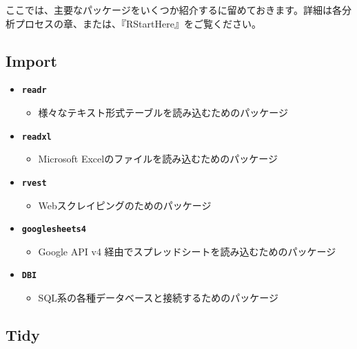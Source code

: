 \documentclass[
  12pt,
]{book}
\providecommand{\tightlist}{%
  \setlength{\itemsep}{0pt}\setlength{\parskip}{0pt}}
\begin{document}
ここでは、主要なパッケージをいくつか紹介するに留めておきます。詳細は各分析プロセスの章、または、『RStartHere』\citep{RStartHere}をご覧ください。

\hypertarget{import-1}{%
\subsection*{Import}\label{import-1}}

\begin{itemize}
\tightlist
\item
  \textbf{\texttt{readr}}

  \begin{itemize}
  \tightlist
  \item
    様々なテキスト形式テーブルを読み込むためのパッケージ\citep{R-readr}
  \end{itemize}
\item
  \textbf{\texttt{readxl}}

  \begin{itemize}
  \tightlist
  \item
    Microsoft Excelのファイルを読み込むためのパッケージ\citep{R-readxl}
  \end{itemize}
\item
  \textbf{\texttt{rvest}}

  \begin{itemize}
  \tightlist
  \item
    Webスクレイピングのためのパッケージ\citep{R-rvest}
  \end{itemize}
\item
  \textbf{\texttt{googlesheets4}}

  \begin{itemize}
  \tightlist
  \item
    Google API v4 経由でスプレッドシートを読み込むためのパッケージ\citep{R-googlesheets4}
  \end{itemize}
\item
  \textbf{\texttt{DBI}}

  \begin{itemize}
  \tightlist
  \item
    SQL系の各種データベースと接続するためのパッケージ\citep{R-DBI}
  \end{itemize}
\end{itemize}

\hypertarget{tidy-1}{%
\subsection*{Tidy}\label{tidy-1}}
\end{document}
